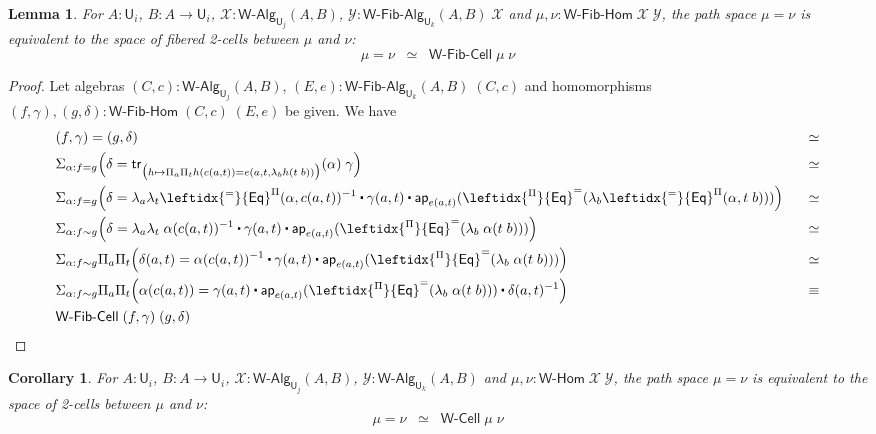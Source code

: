 \documentclass[reqno,10pt,a4paper,oneside]{amsart}
\numberwithin{equation}{section}
\theoremstyle{mythm}
\newtheorem{lemma}[theorem]{Lemma}
\newtheorem{corollary}[theorem]{Corollary}
\theoremstyle{mydef}
\theoremstyle{myrmk}
\newcommand{\trans}{\mathsf{tr}}
\newcommand{\ct}{%
  \mathchoice{\mathbin{\raisebox{0.5ex}{$\displaystyle\centerdot$}}}%
             {\mathbin{\raisebox{0.5ex}{$\centerdot$}}}%
             {\mathbin{\raisebox{0.25ex}{$\scriptstyle\,\centerdot\,$}}}%
             {\mathbin{\raisebox{0.1ex}{$\scriptscriptstyle\,\centerdot\,$}}}}
\newcommand{\funext}{\leftidx{^\Pi}{\mathsf{Eq}}^{=}}
\newcommand{\happly}{\leftidx{^=}{\mathsf{Eq}}^{\Pi}}
\newcommand{\prd}[1]{\Pi_{#1}}
\newcommand{\sm}[1]{\Sigma_{#1}}
\newcommand{\lam}[1]{\lambda_{#1}}
\newcommand{\app}{\mathsf{ap}}
\newcommand{\UU}{\mathsf{U}}
\newcommand{\WCell}{\mathsf{W}\text{-}\mathsf{Cell}}
\newcommand{\WFibCell}{\mathsf{W}\text{-}\mathsf{Fib}\text{-}\mathsf{Cell}}
\newcommand{\WAlg}{\mathsf{W}\text{-}\mathsf{Alg}}
\newcommand{\WFibAlg}{\mathsf{W}\text{-}\mathsf{Fib}\text{-}\mathsf{Alg}}
\newcommand{\WHom}{\mathsf{W}\text{-}\mathsf{Hom}}
\newcommand{\WFibHom}{\mathsf{W}\text{-}\mathsf{Fib}\text{-}\mathsf{Hom}}
\newcommand{\X}{\mathcal{X}}
\newcommand{\Y}{\mathcal{Y}}
\begin{document}
\begin{lemma}\label{WFibHomSpace}
For $A:\UU_i$, $B : A \to \UU_i$, $\X : \WAlg_{\UU_j}(A,B)$, $\Y : \WFibAlg_{\UU_k}(A,B) \; \X$ and $\mu,\nu : \WFibHom \; \X \; \Y$, the path space $\mu = \nu$ is equivalent to the space of fibered 2-cells between $\mu$ and $\nu$:
\[ \mu = \nu \;\; \simeq \;\; \WFibCell \; \mu \; \nu \] 
\end{lemma}
\begin{proof}
Let algebras $(C,c) : \WAlg_{\UU_j}(A,B)$, $(E,e) : \WFibAlg_{\UU_k}(A,B) \; (C,c)$ and homomorphisms $(f,\gamma), (g,\delta) : \WFibHom \; (C,c) \; (E,e)$ be given. We have
\begin{alignat*}{4}
& (f,\gamma) = (g,\delta) & \simeq \\
& \sm{\alpha : f = g} \Big(\delta = \trans_{\big(h \mapsto \prd{a}\prd{t} h(c(a,t)) = e(a,t,\lam{b} h(t\;b))\big)}(\alpha) \; \gamma\Big) & \simeq \\
& \sm{\alpha : f = g} \Big(\delta = \lam{a} \lam{t} \happly(\alpha,c(a,t))^{-1} \ct \gamma(a,t) \ct \app_{e(a,t)}(\funext (\lam{b}\happly(\alpha,t \; b))) \Big) & \;\;\; \simeq \\
& \sm{\alpha : f \sim g} \Big(\delta = \lam{a} \lam{t} \; \alpha(c(a,t))^{-1} \ct \gamma(a,t) \ct \app_{e(a,t)}(\funext (\lam{b}\; \alpha(t \; b))) \Big) & \simeq \\
& \sm{\alpha : f \sim g} \prd{a}\prd{t}\Big(\delta(a,t) = \alpha(c(a,t))^{-1} \ct \gamma(a,t) \ct \app_{e(a,t)}(\funext (\lam{b}\; \alpha(t \; b))) \Big) & \simeq \\ 
& \sm{\alpha : f \sim g} \prd{a}\prd{t}\Big(\alpha(c(a,t)) = \gamma(a,t) \ct \app_{e(a,t)}(\funext (\lam{b}\; \alpha(t \; b))) \ct \delta(a,t)^{-1} \Big) & \equiv \\ 
& \WFibCell \; (f,\gamma) \; (g,\delta)
\end{alignat*}
\end{proof}

\begin{corollary}\label{WHomSpace}
For $A:\UU_i$, $B : A \to \UU_i$, $\X : \WAlg_{\UU_j}(A,B)$, $\Y : \WAlg_{\UU_k}(A,B)$ and $\mu,\nu : \WHom \; \X \; \Y$, the path space $\mu = \nu$ is equivalent to the space of 2-cells between $\mu$ and $\nu$:
\[ \mu = \nu \;\; \simeq \;\; \WCell \; \mu \; \nu \] 
\end{corollary}
\end{document}
